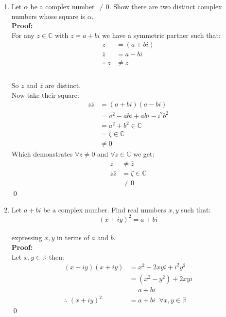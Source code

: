 \begin{enumerate}
	\item Let $\alpha$ be a complex number $\neq 0.$ Show there are two distinct complex numbers whose square is $\alpha.$ \\
	
	\textbf{Proof:} \\
	For any $z \in \mathbb{C}$ with $z = a + bi$ we have a symmetric partner such that: 
	\begin{align*}
		z &= (a + bi) \\
		\bar{z} &= a - bi \\
		\therefore \; z &\neq \bar{z} \\
	\end{align*}
	\\
	So $z$ and $\bar{z}$ are distinct. \\

	Now take their square:
	\begin{align*}
		z \bar{z} &= (a + bi)(a - bi) \\
		&= a^2 -abi +abi -i^2 b^2 \\
		&= a^2 + b^2 \in \mathbb{C} \\
		&= \zeta \in \mathbb{C} \\
		&\neq 0
	\end{align*}
	Which demonstrates $\forall z \neq 0$ and $\forall z \in \mathbb{C}$ we get:
	\begin{align*}
		z & \neq \bar{z} \\
		z \bar{z} &= \zeta \in \mathbb{C} \\
		&\neq 0
	\end{align*}
	\qed

	\item Let $a + bi$ be a complex number. Find real numbers $x, y$ such that:
	\[(x + iy)^2 = a + bi\] \\
	expressing $x, y$ in terms of $a$ and $b.$ \\
	
	\textbf{Proof:} \\
	Let $x, y \in \mathbb{R}$ then:
	\begin{align*}
		(x + iy)(x + iy) &= x^2 +2xyi + i^2 y^2 \\
		&= (x^2 - y^2) + 2xyi \\
		&= a + bi \\
		\therefore \; (x + iy)^2 &= a + bi \;\; \forall x, y \in \mathbb{R}
	\end{align*}
	\qed


\end{enumerate}
